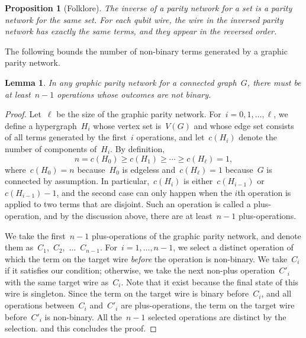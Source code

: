 \documentclass[a4paper,cleveref, autoref, 11pt, fleqn, thm-restate]{article}
\theoremstyle{plain}
\newtheorem{lemma}[theorem]{Lemma}
\newtheorem{proposition}[theorem]{Proposition}
\begin{document}
\begin{proposition}[Folklore]
  \label{lem:reverse}
  The inverse of a parity network for a set is a parity network for the same set.  For each qubit wire, the wire in the inversed parity network has exactly the same terms, and they appear in the reversed order.
\end{proposition}

The following bounds the number of non-binary terms generated by a graphic parity network.

\begin{lemma}
  \label{lem:stronger}
  In any graphic parity network for a connected graph~$G$, there must be at least~$n-1$ operations whose outcomes are not binary.
\end{lemma}
\begin{proof}
  Let~$\ell$ be the size of the graphic parity network.  For~$i = 0, 1, \ldots, \ell$, we define a hypergraph~$H_{i}$ whose vertex set is~$V(G)$ and whose edge set consists of all terms generated by the first~$i$ operations, and let~$c(H_{i})$ denote the number of components of~$H_{i}$.
  By definition,
  \[
    n = c(H_{0}) \ge c(H_{1}) \ge \cdots \ge c(H_{\ell}) = 1,
  \]
  where~$c(H_{0}) = n$ because~$H_{0}$ is edgeless and~$c(H_{\ell}) = 1$ because~$G$ is connected by assumption.
  In particular,~$c(H_{i})$ is either~$c(H_{i-1})$ or~$c(H_{i-1}) - 1$, and the second case can only happen when the $i$th operation is applied to two terms that are disjoint.
  Such an operation is called a plus-operation, and by the discussion above, there are at least~$n - 1$ plus-operations.

  We take the first~$n - 1$ plus-operations of the graphic parity network, and denote them as~$C_{1}$,~$C_{2}$,~$\ldots$~$C_{n-1}$.
  For~$i = 1, \ldots, n - 1$, we select a distinct operation of which the term on the target wire \emph{before} the operation is non-binary.
  We take~$C_{i}$ if it satisfies our condition; otherwise, we take the next non-plus operation~$C'_{i}$ with the same target wire as~$C_{i}$.
  Note that it exist because the final state of this wire is singleton.
  Since the term on the target wire is binary before~$C_{i}$, and all operations between~$C_{i}$ and~$C'_{i}$ are plus-operations, the term on the target wire before~$C'_{i}$ is non-binary.
  All the~$n-1$ selected operations are distinct by the selection.
   and this concludes the proof.
\end{proof}
\end{document}
